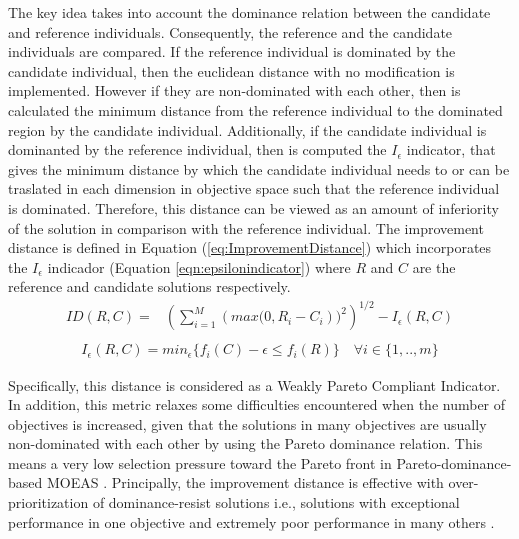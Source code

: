 The key idea takes into account the dominance relation between the candidate and reference individuals. %
%
%
Consequently, the reference and the candidate individuals are compared.
%
If the reference individual is dominated by the candidate individual, then the euclidean distance with no modification is implemented.
%
However if they are non-dominated with each other, then is calculated the minimum distance from the reference individual to the dominated region by the candidate individual. %
%
Additionally, if the candidate individual is dominanted by the reference individual, then is computed the $I_\epsilon$ indicator, that gives the minimum distance by which the candidate individual needs to or can be traslated in each dimension in objective space such that the reference individual is dominated.
%
Therefore, this distance can be viewed as an amount of inferiority of the solution in comparison with the reference individual.	
%
The improvement distance is defined in Equation (\ref{eq:ImprovementDistance}) which incorporates the $I_\epsilon$ indicador (Equation \ref{eqn:epsilonindicator})  where $R$ and $C$ are the reference and candidate solutions respectively. 
\begin{equation} \label{eq:ImprovementDistance}
\begin{split}
 ID(R, C) = &  \left (\sum_{i=1}^M \left (max(0, R_i - C_i \right ))^2  \right)^{1/2} - I_\epsilon(R,C) \\
\end{split}
\end{equation}
\begin{equation}\label{eqn:epsilonindicator}
\begin{split}
I_\epsilon(R,C) = min_{\epsilon} \{ f_i(C) - \epsilon \leq f_i (R) \} \quad \forall i \in \{1,..,m \}
\end{split}
\end{equation}

Specifically, this distance is considered as a Weakly Pareto Compliant Indicator.
%
In addition, this metric relaxes some difficulties encountered when the number of objectives is increased, given that the solutions in many objectives are usually non-dominated with each other by using the Pareto dominance relation.
%
This means a very low selection pressure toward the Pareto front in Pareto-dominance-based MOEAS \cite{Joel:Optimization_Of_Scalarizing_Functions_Through_Evolutionary_MOEAS}.
%
Principally, the improvement distance is effective with over-prioritization  of dominance-resist solutions i.e., solutions with exceptional performance in one objective and extremely poor performance in many others \cite{Joel:Failure_MOEAs}.
%
